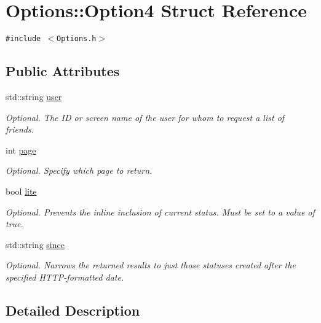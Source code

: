 \hypertarget{structOptions_1_1Option4}{
\section{Options::Option4 Struct Reference}
\label{structOptions_1_1Option4}
}
{\tt \#include $<$Options.h$>$}

\subsection*{Public Attributes}
\begin{CompactItemize}
\item 
std::string \hyperlink{structOptions_1_1Option4_f649f812e432689a3325dbd15a0945b3}{user}
\begin{CompactList}\small\item\em Optional. The ID or screen name of the user for whom to request a list of friends. \item\end{CompactList}\item 
int \hyperlink{structOptions_1_1Option4_2cd219e536ea8d03a734b4cd91a4b146}{page}
\begin{CompactList}\small\item\em Optional. Specify which page to return. \item\end{CompactList}\item 
bool \hyperlink{structOptions_1_1Option4_f417267bbe5eb7368b9b0f820eabe617}{lite}
\begin{CompactList}\small\item\em Optional. Prevents the inline inclusion of current status. Must be set to a value of true. \item\end{CompactList}\item 
std::string \hyperlink{structOptions_1_1Option4_56a504649fb129f628e3b99fb6bb6985}{since}
\begin{CompactList}\small\item\em Optional. Narrows the returned results to just those statuses created after the specified HTTP-formatted date. \item\end{CompactList}\end{CompactItemize}


\subsection{Detailed Description}


